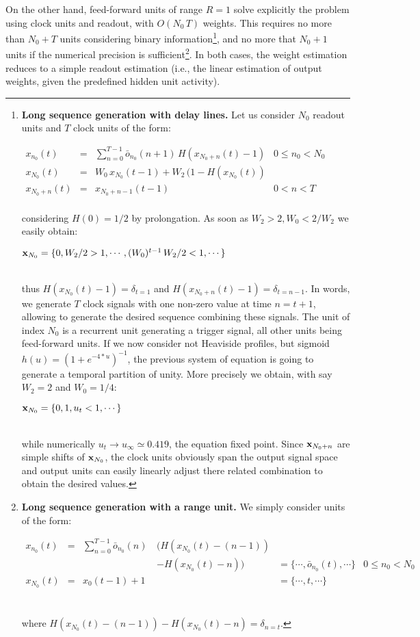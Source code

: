 On the other hand, feed-forward units of range $R=1$ solve explicitly the problem using clock units and readout, with $O(N_0\,T)$ weights. This requires no more than $N_0+T$ units considering binary information\footnote{ {\bf Long sequence generation with delay lines.} Let us consider $N_0$ readout units and $T$ clock units of the form: \\ \centerline{$\begin{array}{rcll}
x_{n_0}(t) &=& \sum_{n = 0}^{T-1} \bar{o}_{n_0}(n+1) \, H(x_{N_0+n}(t) - 1) & 0 \leq n_0 < N_0 \\
x_{N_0}(t) &=&  W_0 \, x_{N_0}(t-1) + W_2 \, (1 - H(x_{N_0}(t)) \\
x_{N_0+n}(t) &=& x_{N_0+n-1}(t-1) & 0 < n < T \\
\end{array}$} considering $H(0) = 1/2$ by prolongation. As soon as $W_2 > 2, W_0 < 2 / W_2$ we easily obtain: 
\\ \centerline{${\bf x}_{N_0} = \{0,  W_2 / 2 > 1, \cdots, (W_0)^{t-1} \, W_2 / 2 < 1, \cdots\}$} \\
thus $H(x_{N_0}(t) - 1) = \delta_{t=1}$ and $H(x_{N_0+n}(t) - 1) = \delta_{t=n-1}$. In words, we generate $T$ clock signals with one non-zero value at time $n=t+1$, allowing to generate the desired sequence combining these signals. The unit of index $N_0$ is a recurrent unit generating a trigger signal, all other units being feed-forward units. 
If we now consider not Heaviside profiles, but sigmoid $h(u) = \left(1 + e^{-4 * u}\right)^{-1}$, the previous system of equation is going to generate a temporal partition of unity. More precisely we obtain, with say $W_2 = 2$ and $W_0 = 1/4$:
\\ \centerline{${\bf x}_{N_0} = \{0, 1, u_t < 1, \cdots\}$}\\ while numerically $u_t \rightarrow u_{\infty} \simeq 0.419$, the equation fixed point. Since ${\bf x}_{N_0+n}$ are simple shifts of ${\bf x}_{N_0}$, the clock units obviously span the output signal space and output units can easily linearly adjust there related combination to obtain the desired values.}, 
and no more that $N_0+1$ units if the numerical precision is sufficient\footnote{ {\bf Long sequence generation with a range unit.} We simply consider units of the form: \\ \centerline{$\begin{array}{rcrlllr}
x_{n_0}(t) &=& \sum_{n = 0}^{T-1} \bar{o}_{n_0}(n) \, &(H(x_{N_0}(t) - (n-1)) &\\&&&- H(x_{N_0}(t) - n)) & = \{\cdots, \bar{o}_{n_0}(t), \cdots\} & 0 \leq n_0 < N_0 \\
x_{N_0}(t) &=&  x_0(t-1) + 1 && = \{\cdots, t, \cdots\} \\
\end{array}$}\\ where $H(x_{N_0}(t) - (n-1)) - H(x_{N_0}(t) - n) = \delta_{n=t}$.}. In both cases, the weight estimation reduces to a simple readout estimation (i.e., the linear estimation of output weights, given the predefined hidden unit activity).
